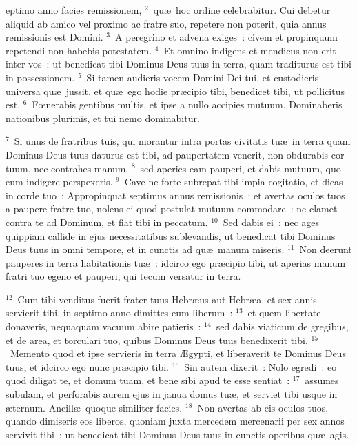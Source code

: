 \bchapter
{}eptimo anno facies remissionem,
${}^{2}$~qu\ae\ hoc ordine celebrabitur. Cui debetur aliquid ab amico vel proximo ac fratre suo, repetere non poterit, quia annus remissionis est Domini.
${}^{3}$~A peregrino et advena exiges~: civem et propinquum repetendi non habebis potestatem.
${}^{4}$~Et omnino indigens et mendicus non erit inter vos~: ut benedicat tibi Dominus Deus tuus in terra, quam traditurus est tibi in possessionem.
${}^{5}$~Si tamen audieris vocem Domini Dei tui, et custodieris universa qu\ae\ jussit, et qu\ae\ ego hodie pr\ae cipio tibi, benedicet tibi, ut pollicitus est.
${}^{6}$~Fœnerabis gentibus multis, et ipse a nullo accipies mutuum. Dominaberis nationibus plurimis, et tui nemo dominabitur.


${}^{7}$~Si unus de fratribus tuis, qui morantur intra portas civitatis tu\ae\ in terra quam Dominus Deus tuus daturus est tibi, ad paupertatem venerit, non obdurabis cor tuum, nec contrahes manum,
${}^{8}$~sed aperies eam pauperi, et dabis mutuum, quo eum indigere perspexeris.
${}^{9}$~Cave ne forte subrepat tibi impia cogitatio, et dicas in corde tuo~: Appropinquat septimus annus remissionis~: et avertas oculos tuos a paupere fratre tuo, nolens ei quod postulat mutuum commodare~: ne clamet contra te ad Dominum, et fiat tibi in peccatum.
${}^{10}$~Sed dabis ei~: nec ages quippiam callide in ejus necessitatibus sublevandis, ut benedicat tibi Dominus Deus tuus in omni tempore, et in cunctis ad qu\ae\ manum miseris.
${}^{11}$~Non deerunt pauperes in terra habitationis tu\ae~: idcirco ego pr\ae cipio tibi, ut aperias manum fratri tuo egeno et pauperi, qui tecum versatur in terra.


${}^{12}$~Cum tibi venditus fuerit frater tuus Hebr\ae us aut Hebr\ae a, et sex annis servierit tibi, in septimo anno dimittes eum liberum~:
${}^{13}$~et quem libertate donaveris, nequaquam vacuum abire patieris~:
${}^{14}$~sed dabis viaticum de gregibus, et de area, et torculari tuo, quibus Dominus Deus tuus benedixerit tibi.
${}^{15}$~Memento quod et ipse servieris in terra \AE gypti, et liberaverit te Dominus Deus tuus, et idcirco ego nunc pr\ae cipio tibi.
${}^{16}$~Sin autem dixerit~: Nolo egredi~: eo quod diligat te, et domum tuam, et bene sibi apud te esse sentiat~:
${}^{17}$~assumes subulam, et perforabis aurem ejus in janua domus tu\ae , et serviet tibi usque in \ae ternum. Ancill\ae\ quoque similiter facies.
${}^{18}$~Non avertas ab eis oculos tuos, quando dimiseris eos liberos, quoniam juxta mercedem mercenarii per sex annos servivit tibi~: ut benedicat tibi Dominus Deus tuus in cunctis operibus qu\ae\ agis.


